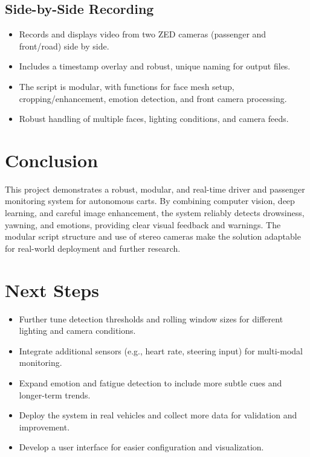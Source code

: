 \documentclass[12pt]{article}
\begin{document}
\subsection{Side-by-Side Recording}
\begin{itemize}
    \item Records and displays video from two ZED cameras (passenger and front/road) side by side.
    \item Includes a timestamp overlay and robust, unique naming for output files.
    \item The script is modular, with functions for face mesh setup, cropping/enhancement, emotion detection, and front camera processing.
    \item Robust handling of multiple faces, lighting conditions, and camera feeds.
\end{itemize}

\section{Conclusion}
This project demonstrates a robust, modular, and real-time driver and passenger monitoring system for autonomous carts. By combining computer vision, deep learning, and careful image enhancement, the system reliably detects drowsiness, yawning, and emotions, providing clear visual feedback and warnings. The modular script structure and use of stereo cameras make the solution adaptable for real-world deployment and further research.

\section{Next Steps}
\begin{itemize}
    \item Further tune detection thresholds and rolling window sizes for different lighting and camera conditions.
    \item Integrate additional sensors (e.g., heart rate, steering input) for multi-modal monitoring.
    \item Expand emotion and fatigue detection to include more subtle cues and longer-term trends.
    \item Deploy the system in real vehicles and collect more data for validation and improvement.
    \item Develop a user interface for easier configuration and visualization.
\end{itemize}
\end{document}
